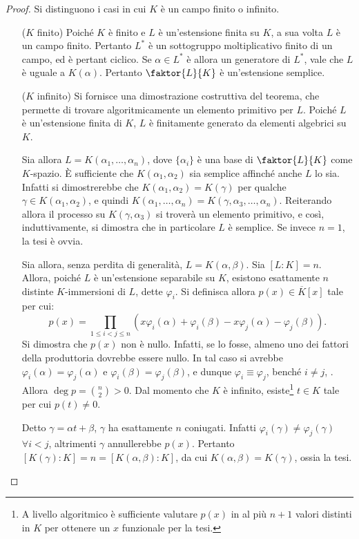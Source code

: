 \documentclass[12pt]{scrartcl}
\begin{document}
	\begin{proof}
		Si distinguono i casi in cui $K$ è un campo finito
		o infinito.
		
		\begin{itemize}
			\item[($K$ finito)\;] Poiché $K$ è finito e
			$L$ è un'estensione finita su $K$, a sua volta
			$L$ è un campo finito. Pertanto $L^*$ è un
			sottogruppo moltiplicativo finito di un campo, ed
			è pertant ciclico. Se $\alpha \in L^*$ è allora
			un generatore di $L^*$, vale che $L$ è uguale a
			$K(\alpha)$. Pertanto $\faktor{L}{K}$ è un'estensione
			semplice.

			\item[($K$ infinito)\;] 
			Si fornisce una dimostrazione costruttiva del
			teorema, che permette di trovare algoritmicamente
			un elemento primitivo per $L$.
			Poiché $L$ è un'estensione
			finita di $K$, $L$ è finitamente generato da
			elementi algebrici su $K$. \medskip
			
			
			Sia allora
			$L = K(\alpha_1, \ldots, \alpha_n)$, dove
			$\{ \alpha_i \}$ è una base di
			$\faktor{L}{K}$ come $K$-spazio. È sufficiente
			che $K(\alpha_1, \alpha_2)$ sia semplice affinché
			anche $L$ lo sia. Infatti
			si dimostrerebbe che $K(\alpha_1, \alpha_2) =
			K(\gamma)$ per qualche $\gamma \in K(\alpha_1, \alpha_2)$,
			e quindi $K(\alpha_1, \ldots, \alpha_n) =
			K(\gamma, \alpha_3, \ldots, \alpha_n)$. Reiterando
			allora il processo su $K(\gamma, \alpha_3)$ si
			troverà un elemento primitivo, e così, induttivamente,
			si dimostra che in particolare $L$ è semplice. Se
			invece $n = 1$, la tesi è ovvia. \medskip
			
			
			Sia allora, senza perdita di generalità, $L = K(\alpha, \beta)$. Sia $[L : K] = n$. Allora, poiché $L$
			è un'estensione separabile su $K$, esistono
			esattamente $n$ distinte $K$-immersioni di $L$,
			dette $\varphi_i$.
			Si definisca allora $p(x) \in \overline{K}[x]$ tale per cui:
			\[ p(x) = \prod_{1 \leq i < j \leq n} (x \varphi_i(\alpha) + \varphi_i(\beta) - x \varphi_j(\alpha) - \varphi_j(\beta)). \]
			Si dimostra che $p(x)$ non è nullo. Infatti,
			se lo fosse, almeno uno dei fattori della produttoria
			dovrebbe essere nullo. In tal caso si avrebbe
			$\varphi_i(\alpha) = \varphi_j(\alpha)$ e
			$\varphi_i(\beta) = \varphi_j(\beta)$, e dunque
			$\varphi_i \equiv \varphi_j$, benché $i \neq j$,
			\Lightning. Allora $\deg p = \binom{n}{2} > 0$.
			Dal momento che $K$ è infinito, esiste\footnote{
				A livello algoritmico è sufficiente valutare
				$p(x)$ in al più $n+1$ valori distinti in $K$
				per ottenere un $x$ funzionale per la tesi.
			} $t \in K$
			tale per cui $p(t) \neq 0$. \medskip
			
			
			Detto $\gamma = \alpha t + \beta$, $\gamma$
			ha esattamente $n$ coniugati. Infatti
			$\varphi_i(\gamma) \neq \varphi_j(\gamma)$ $\forall i < j$, altrimenti $\gamma$ annullerebbe $p(x)$. Pertanto
			$[K(\gamma) : K] = n = [K(\alpha, \beta) : K]$,
			da cui $K(\alpha, \beta) = K(\gamma)$, ossia la tesi.
		\end{itemize}
	\end{proof}
	
\end{document}
